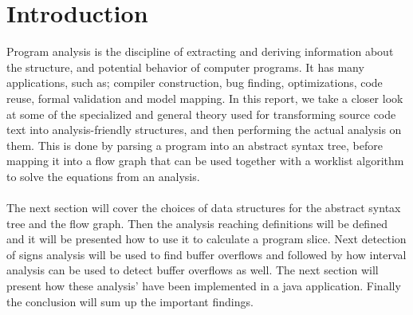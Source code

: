 \chapter{Introduction}
Program analysis is the discipline of extracting and deriving information about the structure, and potential behavior of computer programs. It has many applications, such as; compiler construction, bug finding, optimizations, code reuse, formal validation and model mapping. In this report, we take a closer look at some of the specialized and general theory used for transforming source code text into analysis-friendly structures, and then performing the actual analysis on them. This is done by parsing a program into an abstract syntax tree, before mapping it into a flow graph that can be used together with a worklist algorithm to solve the equations from an analysis.
\\
\\
The next section will cover the choices of data structures for the abstract syntax tree and the flow graph. Then the analysis reaching definitions will be defined and it will be presented how to use it to calculate a program slice. Next detection of signs analysis will be used to find buffer overflows and followed by how interval analysis can be used to detect buffer overflows as well. The next section will present how these analysis' have been implemented in a java application. Finally the conclusion will sum up the important findings.